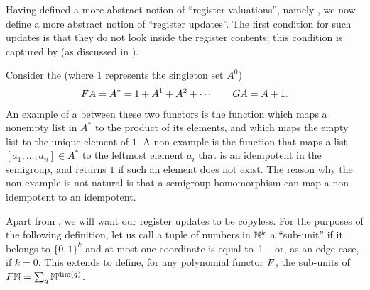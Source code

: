 Having defined a more abstract notion of \enquote{register valuations}, namely
, we now define a more abstract notion of
\enquote{register updates}. The first condition for such updates is that they do
not look inside the register contents; this condition is captured by
 (as discussed in ).

\begin{example}
    Consider the  (where $1$ represents the singleton set $A^0$)
    \begin{align*}
    \functor A = A^* = 1 + A^1 + A^2 + \cdots  \qquad \functorg A = A + 1.     \end{align*} 
An example of a  between these two functors is the function which maps a nonempty list in $A^*$ to the product of its elements, and which maps the empty list to the unique element of $1$. A non-example is the function that maps a list $[a_1,\ldots,a_n] \in A^*$ to the leftmost element $a_i$ that is an idempotent in the semigroup, and returns $1$ if such an element does not exist. The reason why the non-example is not natural is that a semigroup homomorphism can map a non-idempotent to an idempotent.
\end{example}


Apart from , we will want our register updates to be copyless.
For the purposes of the following definition, let us call a tuple of numbers in
${\mathbb N}^k$ a \enquote{sub-unit} if it belongs to $\{0,1\}^k$ and at most one
coordinate is equal to~1 -- or, as an edge case, if $k=0$. This extends to
define, for any polynomial functor $\functor$, the sub-units of $\functor\Nat =
\sum_q \Nat^{\dim(q)}$.

